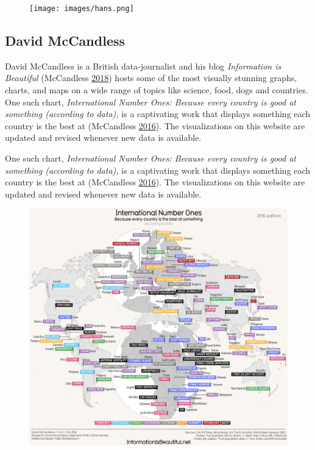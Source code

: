 \documentclass[]{book}
\begin{document}
\begin{figure}
\centering
\texttt{[image: images/hans.png]}
\caption{}
\end{figure}

\subsection{David McCandless}\label{david-mccandless}

David McCandless is a British data-journalist and his blog
\emph{Information is Beautiful} (McCandless
\protect\hyperlink{ref-info_beautiful}{2018}) hosts some of the most
visually stunning graphs, charts, and maps on a wide range of topics
like science, food, dogs and countries. One such chart,
\emph{International Number Ones: Because every country is good at
something (according to data),} is a captivating work that displays
something each country is the best at (McCandless
\protect\hyperlink{ref-country_chart}{2016}). The visualizations on this
website are updated and revised whenever new data is available.

One such chart, \emph{International Number Ones: Because every country
is good at something (according to data),} is a captivating work that
displays something each country is the best at (McCandless
\protect\hyperlink{ref-country_chart}{2016}). The visualizations on this
website are updated and revised whenever new data is available.

\begin{figure}
\centering
\includegraphics{images/Number_ones.png}
\caption{}
\end{figure}
\end{document}
